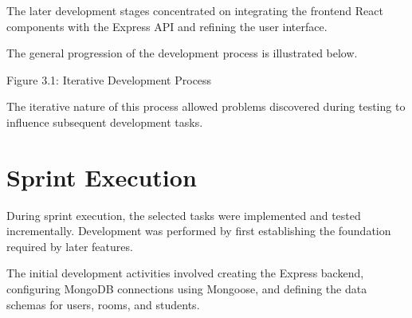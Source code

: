 The later development stages concentrated on integrating the frontend React components with the Express API and refining the user interface.

The general progression of the development process is illustrated below.

\begin{center}
\end{center}

\noindent
Figure 3.1: Iterative Development Process

The iterative nature of this process allowed problems discovered during testing to influence subsequent development tasks.

\section{Sprint Execution}

During sprint execution, the selected tasks were implemented and tested incrementally. Development was performed by first establishing the foundation required by later features.

The initial development activities involved creating the Express backend, configuring MongoDB connections using Mongoose, and defining the data schemas for users, rooms, and students.

